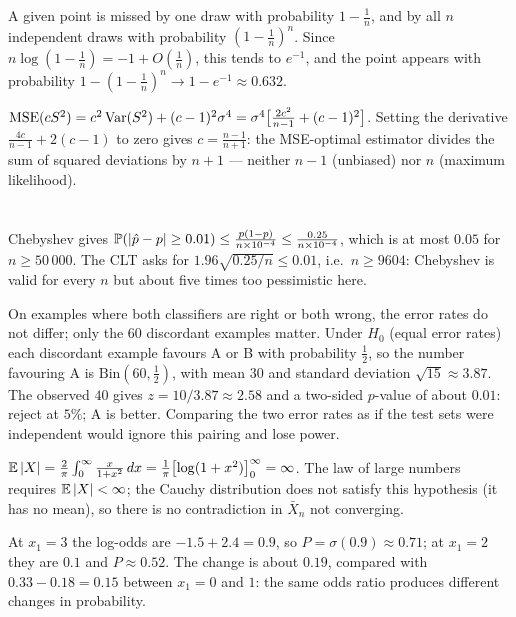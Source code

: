 A given point is missed by one draw with probability $1 - \frac1n$, and by all $n$
independent draws with probability $(1-\frac1n)^n$. Since
$n\log(1-\frac1n) = -1 + O(\frac1n)$, this tends to $e^{-1}$, and the point appears
with probability $1 - (1-\frac1n)^n\to1 - e^{-1}\approx0.632$.

$\mathrm{MSE}(cS^2) = c^2\operatorname{Var}(S^2) + (c-1)^2\sigma^4 = \sigma^4\bigl[\frac{2c^2}{n-1} + (c-1)^2\bigr]$.
Setting the derivative $\frac{4c}{n-1} + 2(c-1)$ to zero gives $c = \frac{n-1}{n+1}$:
the MSE-optimal estimator divides the sum of squared deviations by $n+1$ --- neither
$n-1$ (unbiased) nor $n$ (maximum likelihood).

\section{}

Chebyshev gives $\mathbb{P}(\left|\hat p - p\right|\geq0.01)\leq\frac{p(1-p)}{n\times10^{-4}}\leq\frac{0.25}{n\times10^{-4}}$,
which is at most $0.05$ for $n\geq50\,000$. The CLT asks for
$1.96\sqrt{0.25/n}\leq0.01$, i.e.\ $n\geq9604$: Chebyshev is valid for every $n$ but
about five times too pessimistic here.

On examples where both classifiers are right or both wrong, the error rates do not
differ; only the $60$ discordant examples matter. Under $H_0$ (equal error rates)
each discordant example favours A or B with probability $\frac12$, so the number
favouring A is $\mathrm{Bin}(60,\frac12)$, with mean $30$ and standard deviation
$\sqrt{15}\approx3.87$. The observed $40$ gives $z = 10/3.87\approx2.58$ and a two-sided
$p$-value of about $0.01$: reject at $5\%$; A is better. Comparing the two error
rates as if the test sets were independent would ignore this pairing and lose
power.

$\mathbb{E}\left|X\right| = \frac2\pi\int_0^\infty\frac{x}{1+x^2}\,dx = \frac1\pi\bigl[\log(1+x^2)\bigr]_0^\infty = \infty$.
The law of large numbers requires $\mathbb{E}\left|X\right|<\infty$; the Cauchy distribution does not
satisfy this hypothesis (it has no mean), so there is no contradiction in
$\bar X_n$ not converging.

At $x_1 = 3$ the log-odds are $-1.5 + 2.4 = 0.9$, so $P = \sigma(0.9)\approx0.71$; at
$x_1 = 2$ they are $0.1$ and $P\approx0.52$. The change is about $0.19$, compared with
$0.33 - 0.18 = 0.15$ between $x_1 = 0$ and $1$: the same odds ratio produces
different changes in probability.

